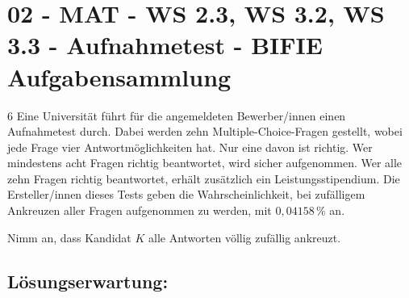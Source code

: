 \section{02 - MAT - WS 2.3, WS 3.2, WS 3.3 - Aufnahmetest - BIFIE Aufgabensammlung}

\begin{langesbeispiel} \item[6] %
Eine Universität führt für die angemeldeten Bewerber/innen einen Aufnahmetest durch. Dabei werden zehn Multiple-Choice-Fragen gestellt, wobei jede Frage vier Antwortmöglichkeiten hat.
Nur eine davon ist richtig. Wer mindestens acht Fragen richtig beantwortet, wird sicher aufgenommen. Wer alle zehn Fragen richtig beantwortet, erhält zusätzlich ein Leistungsstipendium.
Die Ersteller/innen dieses Tests geben die Wahrscheinlichkeit, bei zufälligem Ankreuzen aller Fragen aufgenommen zu werden, mit $0,04158\,\%$ an. 

Nimm an, dass Kandidat $K$ alle Antworten völlig zufällig ankreuzt.%

\begin{aufgabenstellung}
\item %


\item



\end{aufgabenstellung}

\begin{loesung}
\item \subsection{Lösungserwartung:} 

\end{loesung}
\end{langesbeispiel}
